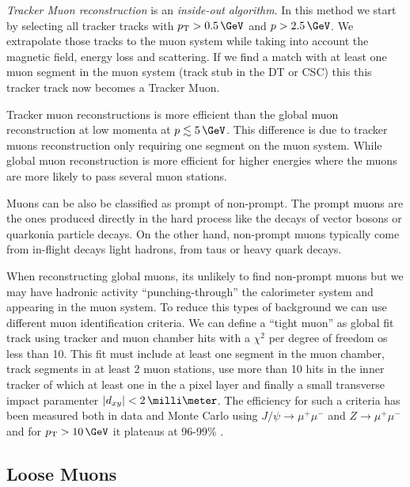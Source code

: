 \textit{Tracker Muon reconstruction} is an \textit{inside-out algorithm}. In this method we start by selecting all tracker tracks with $\pt>0.5\,\GeV$ and $p>2.5\,\GeV$. We extrapolate those tracks to the muon system while taking into account the magnetic field, energy loss and scattering. If we find a match with at least one muon segment in the muon system (track stub in the \gls{DT} or \gls{CSC}) this this tracker track now becomes a Tracker Muon. 

Tracker muon reconstructions is more efficient than the global muon reconstruction at low momenta at $p\lesssim 5\,\GeV$. This difference is due to tracker muons reconstruction only requiring one segment on the muon system. While global muon reconstruction is more efficient for higher energies where the muons are more likely to pass several muon stations.

Muons can be also be classified as prompt of non-prompt. The prompt muons are the ones produced directly in the hard process like the decays of vector bosons or quarkonia particle decays. On the other hand, non-prompt muons typically come from in-flight decays light hadrons, from taus or heavy quark decays. 

When reconstructing global muons, its unlikely to find non-prompt muons but we may have hadronic activity ``punching-through'' the calorimeter system and appearing in the muon system. To reduce this types of background we can use different muon identification criteria. We can define a ``tight muon'' as global fit track using tracker and muon chamber hits with a $\chi^2$ per degree of freedom os less than 10. This fit must include at least one segment in the muon chamber, track segments in at least 2 muon stations, use more than 10 hits in the inner tracker of which at least one in the a pixel layer and finally a small transverse impact paramenter $|d_{xy}|< 2\,\milli\meter$. The efficiency for such a criteria has been measured both in data and Monte Carlo using $J/\psi \rightarrow \mu^+ \mu^-$ and $Z \rightarrow \mu^+ \mu^-$ and for $\pt > 10 \,\GeV$ it plateaus at 96-99\% \cite{ARTICLE:CMSMuonReconstruction7TeV}.

\subsection{Loose Muons}

